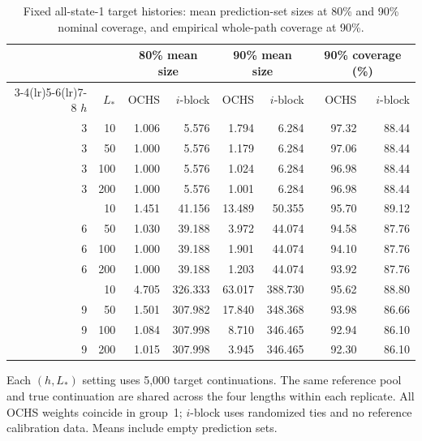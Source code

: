 \begin{table}[!htbp]
\centering
\caption{Fixed all-state-1 target histories: mean prediction-set
sizes at 80\% and 90\% nominal coverage, and empirical whole-path
coverage at 90\%.}
\label{tab:history-length}
\begingroup
\small
\setlength{\tabcolsep}{4pt}
\renewcommand{\arraystretch}{1.06}
\begin{tabular}{@{}rrrrrrrr@{}}
\toprule
 & & \multicolumn{2}{c}{80\% mean size}
 & \multicolumn{2}{c}{90\% mean size}
 & \multicolumn{2}{c}{90\% coverage (\%)} \\
\cmidrule(lr){3-4}\cmidrule(lr){5-6}\cmidrule(lr){7-8}
$h$ & $L_*$ & OCHS & $i$-block & OCHS & $i$-block
 & OCHS & $i$-block \\
\midrule
3 & 10 & 1.006 & 5.576 & 1.794 & 6.284 & 97.32 & 88.44 \\
3 & 50 & 1.000 & 5.576 & 1.179 & 6.284 & 97.06 & 88.44 \\
3 & 100 & 1.000 & 5.576 & 1.024 & 6.284 & 96.98 & 88.44 \\
3 & 200 & 1.000 & 5.576 & 1.001 & 6.284 & 96.98 & 88.44 \\
\addlinespace[3pt]
6 & 10 & 1.451 & 41.156 & 13.489 & 50.355 & 95.70 & 89.12 \\
6 & 50 & 1.030 & 39.188 & 3.972 & 44.074 & 94.58 & 87.76 \\
6 & 100 & 1.000 & 39.188 & 1.901 & 44.074 & 94.10 & 87.76 \\
6 & 200 & 1.000 & 39.188 & 1.203 & 44.074 & 93.92 & 87.76 \\
\addlinespace[3pt]
9 & 10 & 4.705 & 326.333 & 63.017 & 388.730 & 95.62 & 88.80 \\
9 & 50 & 1.501 & 307.982 & 17.840 & 348.368 & 93.98 & 86.66 \\
9 & 100 & 1.084 & 307.998 & 8.710 & 346.465 & 92.94 & 86.10 \\
9 & 200 & 1.015 & 307.998 & 3.945 & 346.465 & 92.30 & 86.10 \\
\bottomrule
\end{tabular}
\par\vspace{4pt}
\begin{minipage}{0.98\linewidth}
\footnotesize
Each $(h,L_*)$ setting uses 5,000 target continuations. The same
reference pool and true continuation are shared across the four
lengths within each replicate. All OCHS weights coincide in group~1;
$i$-block uses randomized ties and no reference calibration data.
Means include empty prediction sets.
\end{minipage}
\endgroup
\end{table}
